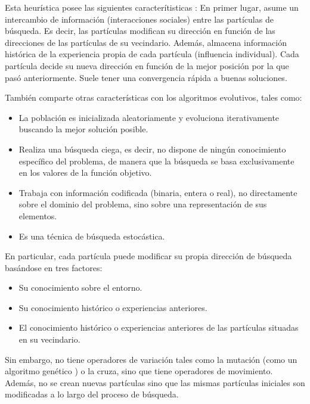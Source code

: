   Esta heur\'istica posee las siguientes caracter\'itisticas \cite{JKRBParticle}: En primer lugar, asume un intercambio de informaci\'on 
  (interacciones sociales) entre las part\'iculas de b\'usqueda. Es decir, las part\'iculas modifican su direcci\'on en funci\'on 
  de las direcciones de las part\'iculas de su vecindario. Adem\'as, almacena informaci\'on hist\'orica de la experiencia propia 
  de cada part\'icula (influencia individual). Cada part\'icula decide su nueva direcci\'on en funci\'on de la mejor posici\'on 
  por la que pas\'o anteriormente. Suele tener una convergencia r\'apida a buenas soluciones.

  Tambi\'en comparte otras caracter\'isticas con los algoritmos evolutivos, tales como:

  \begin{itemize}
   \item La poblaci\'on es inicializada aleatoriamente y evoluciona iterativamente buscando la mejor soluci\'on posible.
   \item Realiza una b\'usqueda ciega, es decir, no dispone de ning\'un conocimiento espec\'ifico del problema, de manera 
   que la b\'usqueda se basa exclusivamente en los valores de la funci\'on objetivo.
   \item Trabaja con informaci\'on codificada (binaria, entera o real), no directamente sobre el dominio del problema, sino sobre 
   una representaci\'on de sus elementos.
   \item Es una t\'ecnica de b\'usqueda estoc\'astica.
  \end{itemize}

  En particular, cada part\'icula puede modificar su propia direcci\'on de b\'usqueda bas\'andose en tres factores:

  \begin{itemize}
   \item Su conocimiento sobre el entorno. 
   \item Su conocimiento hist\'orico o experiencias anteriores.
   \item El conocimiento hist\'orico o experiencias anteriores de las part\'iculas situadas en su vecindario.
  \end{itemize}

  Sin embargo, no tiene operadores de variaci\'on tales como la mutaci\'on (como un algoritmo gen\'etico \cite{YanNSA}) o la cruza, sino que tiene 
  operadores de movimiento. Adem\'as, no se crean nuevas part\'iculas sino que las mismas part\'iculas iniciales son modificadas a 
  lo largo del proceso de b\'usqueda. 

